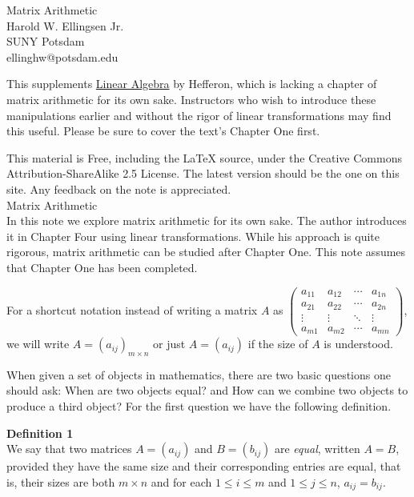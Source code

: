 \documentclass[12pt]{article}
\def\mtrx#1{\begin{pmatrix}
#1_{11} & #1_{12} & \cdots & #1_{1n} \\
#1_{21} & #1_{22} & \cdots & #1_{2n} \\
\vdots & \vdots & \ddots & \vdots \\
#1_{m1} & #1_{m2} & \cdots & #1_{mn}
\end{pmatrix} }
\begin{document}
\begin{center}
Matrix Arithmetic \\
Harold W. Ellingsen Jr. \\
SUNY Potsdam \\
ellinghw@potsdam.edu
\end{center}

This supplements \underline{Linear Algebra} by Hefferon, which is lacking a chapter of matrix arithmetic for its own sake. Instructors who wish to introduce these manipulations earlier and without the rigor of linear transformations may find this useful. Please be sure to cover the text's Chapter One first.

This material is Free, including the LaTeX source, under the Creative Commons Attribution-ShareAlike 2.5 License. The latest version should be the one on this site.
Any feedback on the note is appreciated. \\[.25in]

\noindent
{\Large Matrix Arithmetic} \\

\noindent
In this note we explore matrix arithmetic for its own sake. The author introduces it in Chapter Four using linear transformations. While his approach is quite rigorous, matrix arithmetic can be studied after Chapter One. This note assumes that Chapter One has been completed.

For a shortcut notation instead of writing a matrix $A$ as $\mtrx{a}$, we will write $A = (a_{ij})_{m \times n}$ or just $A = (a_{ij})$ if the size of $A$ is understood. %

When given a set of objects in mathematics, there are two basic questions one should ask: When are two objects equal? and How can we combine two objects to produce
a third object? For the first question we have the following definition.

\noindent
{\bf Definition 1} \\
We say that two matrices $A = (a_{ij})$ and $B = (b_{ij})$ are {\itshape equal}, written $A=B$, provided they have the same size and their corresponding entries are equal, that is, their sizes are both $m \times n$ and for each $1 \leq i \leq m$ and $1 \leq j \leq n$, $a_{ij} = b_{ij}$. 
\end{document}
